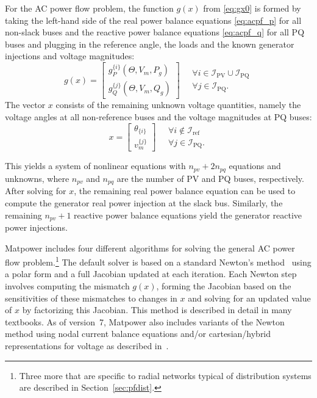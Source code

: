 \documentclass[12pt]{article}
\newcommand{\matpower}[0]{{\sc Matpower}}
\numberwithin{equation}{section}
\numberwithin{table}{section}
\numberwithin{figure}{section}
\begin{document}
For the AC power flow problem, the function $g(x)$ from \eqref{eq:gx0} is formed by taking the left-hand side of the real power balance equations \eqref{eq:acpf_p} for all non-slack buses and the reactive power balance equations \eqref{eq:acpf_q} for all PQ buses and plugging in the reference angle, the loads and the known generator injections and voltage magnitudes:
\begin{equation}
g(x) = \left[\begin{array}{c}
g_P^{\{i\}}(\Theta, V_m, P_g) \\
g_Q^{\{j\}}(\Theta, V_m, Q_g)
\end{array}\right] \quad
\begin{array}{l}
\forall i \in \mathcal{I}_\mathrm{PV} \cup \mathcal{I}_\mathrm{PQ} \\
\forall j \in \mathcal{I}_\mathrm{PQ}.
\end{array}
\label{eq:g_acpf}
\end{equation}
The vector $x$ consists of the remaining unknown voltage quantities, namely the voltage angles at all non-reference buses and the voltage magnitudes at PQ buses:
\begin{equation}
x = \left[\begin{array}{c}
\theta_{\{i\}} \\
v_m^{\{j\}}
\end{array}\right] \quad
\begin{array}{l}
\forall i \notin \mathcal{I}_\mathrm{ref} \\
\forall j \in \mathcal{I}_\mathrm{PQ}.
\end{array}
\label{eq:x_acpf}
\end{equation}

This yields a system of nonlinear equations with $n_{pv} + 2n_{pq}$ equations and unknowns, where $n_{pv}$ and $n_{pq}$ are the number of PV and PQ buses, respectively. After solving for $x$, the remaining real power balance equation can be used to compute the generator real power injection at the slack bus. Similarly, the remaining $n_{pv} + 1$ reactive power balance equations yield the generator reactive power injections.

\matpower{} includes four different algorithms for solving the general AC power flow problem.\footnote{Three more that are specific to radial networks typical of distribution systems are described in Section~\ref{sec:pfdist}.} The default solver is based on a standard Newton's method~\cite{tinney1967} using a polar form and a full Jacobian updated at each iteration. Each Newton step involves computing the mismatch $g(x)$, forming the Jacobian based on the sensitivities of these mismatches to changes in $x$ and solving for an updated value of $x$ by factorizing this Jacobian. This method is described in detail in many textbooks. As of version~7, \matpower{} also includes variants of the Newton method using nodal current balance equations and/or cartesian/hybrid representations for voltage as described in~\cite{sereeter2019}.
\end{document}
